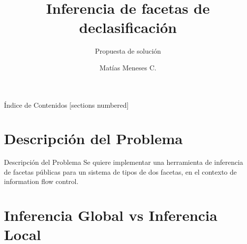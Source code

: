 \documentclass[aspectratio=169,10pt]{beamer}
\title{Inferencia de facetas de declasificación}
\subtitle{Propuesta de solución}
\date{}
\author{Matías Meneses C.}
\institute{}
\begin{document}
\maketitle

\begin{frame}{Índice de Contenidos}
  [sections numbered]
  \tableofcontents[hideallsubsections]
\end{frame}

\section{Descripción del Problema}

\begin{frame}[fragile]{Descripción del Problema}
  Se quiere implementar una herramienta de inferencia de facetas públicas para un sistema de tipos de dos facetas, en el contexto de information flow control.
  \begin{itemize}
  \end{itemize}
\end{frame}

\section{Inferencia Global vs Inferencia Local}
\end{document}
